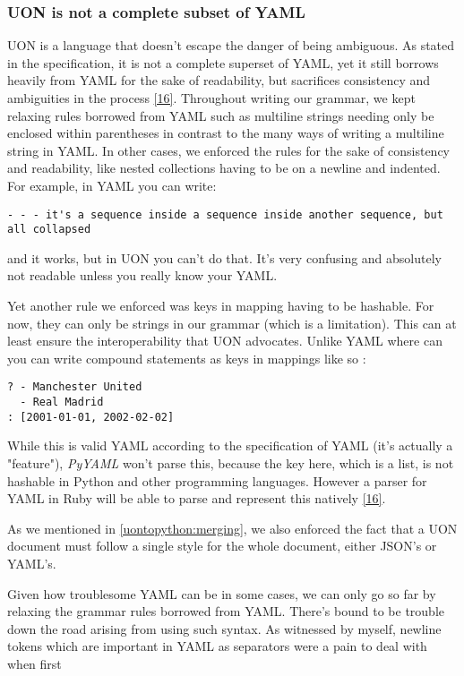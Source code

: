 \documentclass[12pt]{article}
\begin{document}
\subsubsection{UON is not a complete subset of YAML}
UON is a language that doesn't escape the danger of being ambiguous. As stated in the specification, it is not a complete superset of YAML, yet it still borrows heavily from YAML for the sake of readability, but sacrifices consistency and ambiguities in the process \href{https://www.arp242.net/yaml-config.html}{[16]}. Throughout writing our grammar, we kept relaxing rules borrowed from YAML such as multiline strings needing only be enclosed within parentheses in contrast to the many ways of writing a multiline string in YAML. In other cases, we enforced the rules for the sake of consistency and readability, like nested collections having to be on a newline and indented. For example, in YAML you can write:
\begin{lstlisting}
- - - it's a sequence inside a sequence inside another sequence, but all collapsed
\end{lstlisting}
and it works, but in UON you can't do that. It's very confusing and absolutely not readable unless you really know your YAML.

Yet another rule we enforced was keys in mapping having to be hashable. For now, they can only be strings in our grammar (which is a limitation). This can at least ensure the interoperability that UON advocates. Unlike YAML where can you can write compound statements as keys in mappings like so : 
\begin{lstlisting}
? - Manchester United
  - Real Madrid
: [2001-01-01, 2002-02-02]
\end{lstlisting}
While this is valid YAML according to the specification of YAML (it's actually a "feature"), \emph{PyYAML} won't parse this, because the key here, which is a list, is not hashable in Python and other programming languages. However a parser for YAML in Ruby will be able to parse and represent this natively \href{https://www.arp242.net/yaml-config.html}{[16]}.

As we mentioned in \ref{uontopython:merging}, we also enforced the fact that a UON document must follow a single style for the whole document, either JSON's or YAML's.

Given how troublesome YAML can be in some cases, we can only go so far by relaxing the grammar rules borrowed from YAML. There's bound to be trouble down the road arising from using such syntax. As witnessed by myself, newline tokens which are important in YAML as separators were a pain to deal with when first
\end{document}
